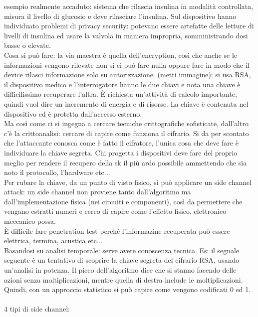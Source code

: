 \documentclass[oneside, 12pt]{extbook}
\begin{document}
esempio realmente accaduto: sistema che rilascia insulina in modalità controllata, misura il livello di glucosio e deve rilasciare l'insulina. Sul dispositivo hanno individuato problemi di privacy security: potevano essere artefatte delle letture di livelli di insulina ed usare la valvola in maniera impropria, somministrando dosi basse o elevate.\\Cosa si può fare: la via maestra è quella dell'encryption, così che anche se le informazioni vengono rilevate non si ci può fare nulla oppure fare in modo che il device rilasci informazione solo su autorizzazione. (metti immagine): si usa RSA, il dispositivo medico e l'interrogatore hanno le due chiavi e nota una chiave è difficilissimo recuperare l'altra. È richiesta un'attività di calcolo importante, quindi vuol dire un incremento di energia e di risorse. La chiave è contenuta nel dispositivo ed è protetta dall'accesso esterno.\\Ma così come ci si ingegna a cercare tecniche crittografiche sofisticate, dall'altro c'è la crittoanalisi: cercare di capire come funziona il cifrario. Si da per scontato che l'attaccante conosca come è fatto il cifratore, l'unica cosa che deve fare è individuare la chiave segreta. Chi progetta i dispositivi deve fare del proprio meglio per rendere il recupero della sk il più ardo possibile ammettendo che sia noto il protocollo, l'hardware etc...\\Per rubare la chiave, da un punto di visto fisico, si può applicare un side channel attack: un side channel non proviene tanto dall'algoritmo ma dall'implementazione fisica (nei circuiti e componenti), così da permettere che vengano estratti numeri e cerco di capire come l'effetto fisico, elettronico meccanico possa.\\È difficile fare penetration test perché l'informazine recuperata può essere elettrica, termina, acustica etc...\\Basandosi su analisi temporale: serve avere conoscenza tecnica. Es: il segnale seguente è un tentativo di scoprire la chiave segreta del cifrario RSA, usando un'analisi in potenza. Il picco dell'algoritmo dice che si stanno facendo delle azioni senza moltiplicazioni, mentre quella di destra include le moltiplicazioni. Quindi, con un approccio statistico si può capire come vengono codificati 0 ed 1.\\\\
4 tipi di side channel:
\end{document}
